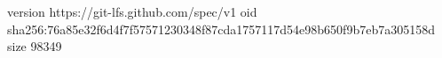 version https://git-lfs.github.com/spec/v1
oid sha256:76a85e32f6d4f7f57571230348f87cda1757117d54e98b650f9b7eb7a305158d
size 98349
